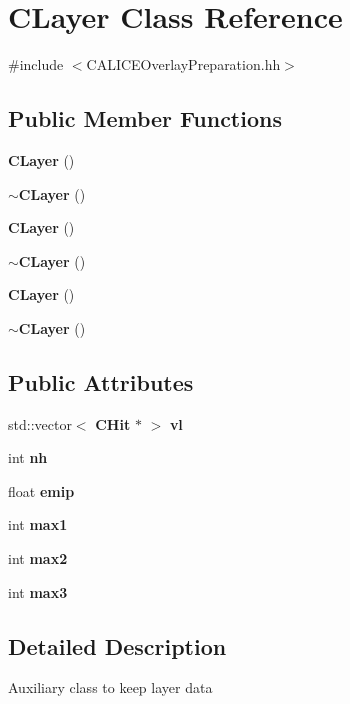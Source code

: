 \section{C\-Layer Class Reference}
\label{classCLayer}


{\ttfamily \#include $<$C\-A\-L\-I\-C\-E\-Overlay\-Preparation.\-hh$>$}

\subsection*{Public Member Functions}
\begin{DoxyCompactItemize}
\item 
{\bf C\-Layer} ()
\item 
{\bf $\sim$\-C\-Layer} ()
\item 
{\bf C\-Layer} ()
\item 
{\bf $\sim$\-C\-Layer} ()
\item 
{\bf C\-Layer} ()
\item 
{\bf $\sim$\-C\-Layer} ()
\end{DoxyCompactItemize}
\subsection*{Public Attributes}
\begin{DoxyCompactItemize}
\item 
std\-::vector$<$ {\bf C\-Hit} $\ast$ $>$ {\bfseries vl}\label{classCLayer_a1f81b6426a1fd05d9ee9c08caf280105}

\item 
int {\bfseries nh}\label{classCLayer_a5ebf93c7468c15249c7d9ff37cc5c4fc}

\item 
float {\bf emip}
\item 
int {\bfseries max1}\label{classCLayer_a5eab519f92a0f426a3c9e9ed6e0f1793}

\item 
int {\bfseries max2}\label{classCLayer_a95819cdd5d6756c7430fcf1139bcd6ec}

\item 
int {\bfseries max3}\label{classCLayer_a1d2af7d79dbe1b745afeddb90df0d301}

\end{DoxyCompactItemize}


\subsection{Detailed Description}
Auxiliary class to keep layer data 

